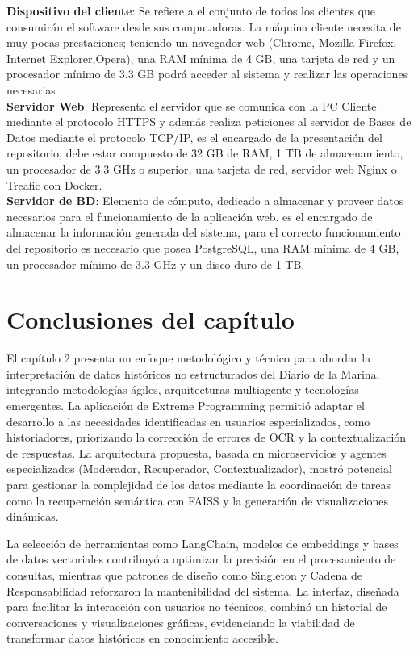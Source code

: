 \textbf{Dispositivo del cliente}: Se refiere a el conjunto de todos los clientes que consumirán el software desde sus computadoras. La máquina cliente necesita de muy pocas
prestaciones; teniendo un navegador web (Chrome, Mozilla Firefox, Internet Explorer,Opera), una RAM mínima de 4 GB, una tarjeta de red y un procesador mínimo de 3.3 GB podrá acceder al sistema y realizar las operaciones necesarias\\
\textbf{Servidor Web}: Representa el servidor que se comunica con la PC Cliente mediante el protocolo HTTPS y además realiza peticiones al servidor de Bases de Datos mediante el protocolo TCP/IP, es el encargado de la presentación del repositorio, debe estar compuesto de 32 GB de RAM, 1 TB de almacenamiento, un procesador de 3.3 GHz o superior, una tarjeta de red, servidor web Nginx o Treafic con Docker.\\
\textbf{Servidor de BD}: Elemento de cómputo, dedicado a almacenar y proveer datos necesarios para el funcionamiento de la aplicación web. es el encargado de almacenar la información generada del
sistema, para el correcto funcionamiento del repositorio es necesario que posea PostgreSQL, una RAM mínima de 4 GB, un procesador mínimo de 3.3 GHz y un disco duro de 1 TB.\\

\section*{Conclusiones del capítulo}

El capítulo 2 presenta un enfoque metodológico y técnico para abordar la interpretación de datos históricos no estructurados del Diario de la Marina, integrando metodologías ágiles, arquitecturas multiagente y tecnologías emergentes. La aplicación de Extreme Programming permitió adaptar el desarrollo a las necesidades identificadas en usuarios especializados, como historiadores, priorizando la corrección de errores de OCR y la contextualización de respuestas. La arquitectura propuesta, basada en microservicios y agentes especializados (Moderador, Recuperador, Contextualizador), mostró potencial para gestionar la complejidad de los datos mediante la coordinación de tareas como la recuperación semántica con FAISS y la generación de visualizaciones dinámicas.

La selección de herramientas como LangChain, modelos de embeddings y bases de datos vectoriales contribuyó a optimizar la precisión en el procesamiento de consultas, mientras que patrones de diseño como Singleton y Cadena de Responsabilidad reforzaron la mantenibilidad del sistema. La interfaz, diseñada para facilitar la interacción con usuarios no técnicos, combinó un historial de conversaciones y visualizaciones gráficas, evidenciando la viabilidad de transformar datos históricos en conocimiento accesible.

